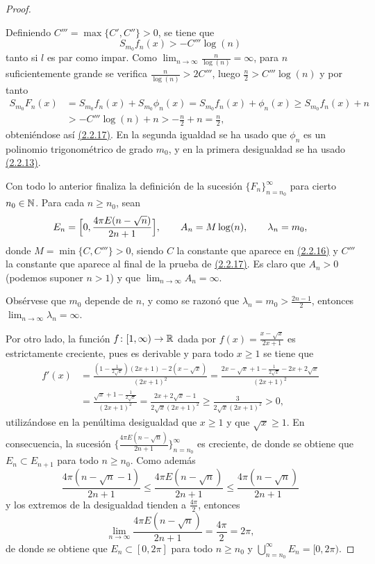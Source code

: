 \documentclass[a4paper, 12pt]{book}
\begin{document}
\begin{proof}
\begin{itemize}
        Definiendo $C''' = \max\{C',C''\} > 0$, se tiene que 
        \[S_{m_0}f_n(x) > -C'''\log(n)\] tanto si $l$ es par como impar. Como $\lim_{n \to \infty} \frac{n}{\log(n)} = \infty$, para $n$ suficientemente grande se verifica $\frac{n}{\log(n)}>2C'''$,
        luego $\frac{n}{2} > C'''\log(n)$ y por tanto 
        \begin{align*}
            S_{m_0}F_n(x) &= S_{m_0}f_n(x)+S_{m_0}\phi_n(x) = S_{m_0}f_n(x)+\phi_n(x) \geq S_{m_0}f_n(x)+n \\
            &> -C'''\log(n)+n > -\frac{n}{2}+n = \frac{n}{2},
        \end{align*}
        obteniéndose así \hyperref[2.2.17]{(2.2.17)}. En la segunda igualdad se ha usado que $\phi_n$ es un polinomio trigonométrico de grado $m_0$, y en la primera desigualdad se ha usado \hyperref[2.2.13]{(2.2.13)}.
    \end{itemize}

    Con todo lo anterior finaliza la definición de la sucesión $\{F_n\}_{n=n_0}^\infty$ para cierto $n_0\in\mathbb N$. Para cada $n \geq n_0$, sean
    \[E_n = \Bigl[0, \frac{4\pi E(n-\sqrt{n})}{2n+1}\Bigr], \qquad A_n = M\log(n), \qquad \lambda_n = m_0,\]
    donde $M = \min\{C,C'''\} > 0$, siendo $C$ la constante que aparece en \hyperref[2.2.16]{(2.2.16)} y $C'''$ la constante que aparece al final de la prueba de \hyperref[2.2.17]{(2.2.17)}. Es claro que $A_n > 0$ (podemos suponer $n>1$) y que $\lim_{n \to \infty} A_n = \infty$.
    
    Obsérvese que $m_0$ depende de $n$, y como se razonó que $\lambda_n = m_0 > \frac{2n-1}{2}$, entonces $\lim_{n\to\infty}\lambda_n = \infty$. 
    
    Por otro lado, la función $f \colon [1,\infty) \to \mathbb R$ dada por $f(x) = \frac{x-\sqrt{x}}{2x+1}$ es estrictamente creciente, pues es derivable y para todo $x \geq 1$ se tiene que
    \begin{align*}
        f'(x) &= \frac{(1-\frac{1}{2\sqrt{x}})(2x+1)-2(x-\sqrt{x})}{(2x+1)^2} = \frac{2x-\sqrt{x}+1-\frac{1}{2\sqrt{x}}-2x+2\sqrt{x}}{(2x+1)^2} \\
        &= \frac{\sqrt{x}+1-\frac{1}{2\sqrt{x}}}{(2x+1)^2} = \frac{2x+2\sqrt{x}-1}{2\sqrt{x}(2x+1)^2} \geq \frac{3}{2\sqrt{x}(2x+1)^2} > 0,
    \end{align*}
    utilizándose en la penúltima desigualdad que $x \geq 1$ y que $\sqrt{x}\geq 1$. En consecuencia, la sucesión $\{\frac{4\pi E(n-\sqrt{n})}{2n+1}\}_{n=n_0}^\infty$ es creciente, de donde se obtiene que $E_n \subset E_{n+1}$ para todo $n \geq n_0$. Como además
    \[\frac{4\pi (n-\sqrt{n}-1)}{2n+1} \leq \frac{4\pi E(n-\sqrt{n})}{2n+1} \leq \frac{4\pi (n-\sqrt{n})}{2n+1} \]
    y los extremos de la desigualdad tienden a $\frac{4\pi}{2}$, entonces \[\lim_{n \to \infty}\frac{4\pi E(n-\sqrt{n})}{2n+1} = \frac{4\pi}{2} = 2\pi,\]
    de donde se obtiene que $E_n \subset [0,2\pi]$ para todo $n \geq n_0$ y $\bigcup_{n=n_0}^\infty E_n = [0,2\pi)$. 
    

\end{proof}
\end{document}
